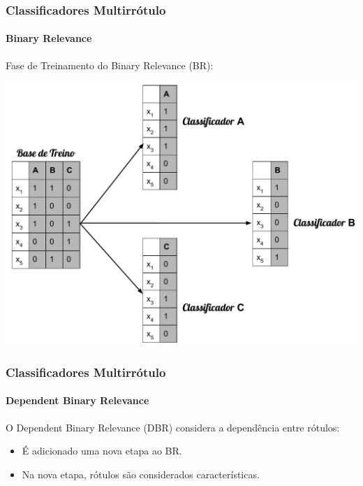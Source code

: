 \documentclass[10pt,fleqn]{beamer}
\begin{document}
\begin{frame}
  \frametitle{Classificadores Multirrótulo}
  \framesubtitle{Binary Relevance}
  Fase de Treinamento do Binary Relevance (BR):
  
    \begin{center}
  \includegraphics[scale=0.4]{BR-figure2}
    \end{center}
\end{frame}

\begin{frame}
  \frametitle{Classificadores Multirrótulo}
  \framesubtitle{Dependent Binary Relevance}
  
  O Dependent Binary Relevance (DBR) considera a dependência entre rótulos:
  
  \begin{itemize}
   \item É adicionado uma nova etapa ao BR.
   \item Na nova etapa, rótulos são considerados características.
  \end{itemize}

\end{frame}
\end{document}
